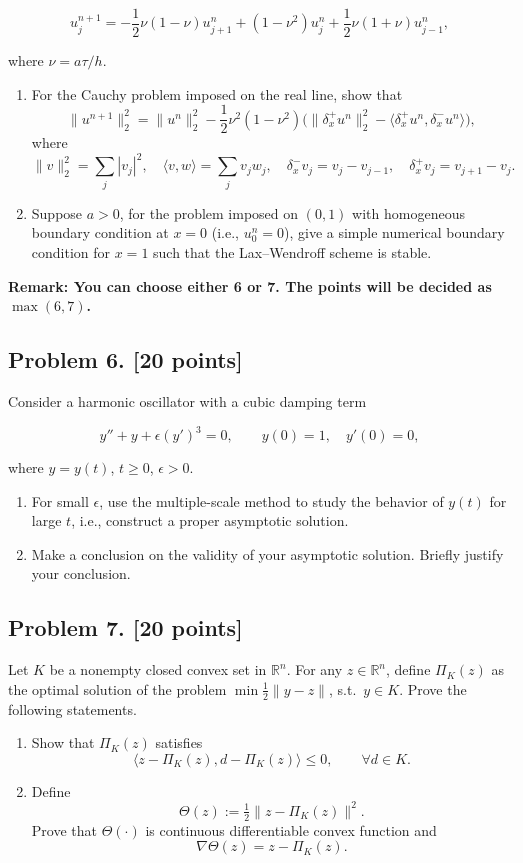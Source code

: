 \documentclass[11pt,a4paper]{article}
\begin{document}
\[
u_{j}^{n+1} = -\frac12 \nu(1-\nu) u_{j+1}^{n} + (1-\nu^{2}) u_{j}^{n} + \frac12 \nu(1+\nu) u_{j-1}^{n},
\]

where \(\nu = a\tau/h\).
\begin{enumerate}[label=(\roman*)]
    \item For the Cauchy problem imposed on the real line, show that
    \[
    \|u^{n+1}\|_{2}^{2} = \|u^{n}\|_{2}^{2} - \frac12 \nu^{2}(1-\nu^{2}) \bigl( \|\delta_{x}^{+} u^{n}\|_{2}^{2} - \langle \delta_{x}^{+} u^{n}, \delta_{x}^{-} u^{n} \rangle \bigr),
    \]
    where
    \[
    \|v\|_{2}^{2} = \sum_{j} |v_{j}|^{2}, \quad \langle v, w \rangle = \sum_{j} v_{j} w_{j}, \quad \delta_{x}^{-} v_{j} = v_{j} - v_{j-1}, \quad \delta_{x}^{+} v_{j} = v_{j+1} - v_{j}.
    \]
    \item Suppose \(a > 0\), for the problem imposed on \((0, 1)\) with homogeneous boundary condition at \(x = 0\) (i.e., \(u_{0}^{n} = 0\)), give a simple numerical boundary condition for \(x = 1\) such that the Lax--Wendroff scheme is stable.
\end{enumerate}



\noindent\textbf{Remark: You can choose either 6 or 7. The points will be decided as \(\max(6,7)\).}

\subsection{Problem 6. [20 points]}
Consider a harmonic oscillator with a cubic damping term

\[
y'' + y + \epsilon (y')^{3} = 0, \qquad y(0) = 1,\quad y'(0) = 0,
\]

where \(y = y(t)\), \(t \ge 0\), \(\epsilon > 0\).
\begin{enumerate}[label=(\roman*)]
    \item For small \(\epsilon\), use the multiple-scale method to study the behavior of \(y(t)\) for large \(t\), i.e., construct a proper asymptotic solution.
    \item Make a conclusion on the validity of your asymptotic solution. Briefly justify your conclusion.
\end{enumerate}

\subsection{Problem 7. [20 points]}
Let \(K\) be a nonempty closed convex set in \(\mathbb{R}^{n}\). For any \(z \in \mathbb{R}^{n}\), define \(\Pi_{K}(z)\) as the optimal solution of the problem \(\min \tfrac12 \|y - z\|\), s.t.\ \(y \in K\). Prove the following statements.
\begin{enumerate}[label=(\roman*)]
    \item Show that \(\Pi_{K}(z)\) satisfies
    \[
    \langle z - \Pi_{K}(z), d - \Pi_{K}(z) \rangle \le 0, \qquad \forall d \in K.
    \]
    \item Define
    \[
    \Theta(z) := \tfrac12 \|z - \Pi_{K}(z)\|^{2}.
    \]
    Prove that \(\Theta(\cdot)\) is continuous differentiable convex function and
    \[
    \nabla \Theta(z) = z - \Pi_{K}(z).
    \]
\end{enumerate}
\end{document}
